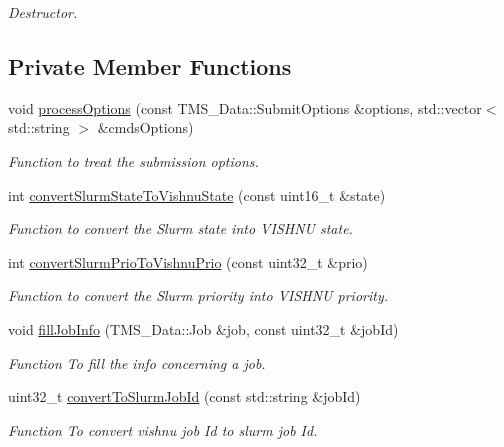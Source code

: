 \begin{DoxyCompactItemize}
\begin{DoxyCompactList}\small\item\em Destructor. \item\end{DoxyCompactList}\end{DoxyCompactItemize}
\subsection*{Private Member Functions}
\begin{DoxyCompactItemize}
\item 
void \hyperlink{classSlurmServer_a04c8991b630a2b23d0da7a9814bcae47}{processOptions} (const TMS\_\-Data::SubmitOptions \&options, std::vector$<$ std::string $>$ \&cmdsOptions)
\begin{DoxyCompactList}\small\item\em Function to treat the submission options. \item\end{DoxyCompactList}\item 
int \hyperlink{classSlurmServer_a294e9fcc0e094584645838773a5f454e}{convertSlurmStateToVishnuState} (const uint16\_\-t \&state)
\begin{DoxyCompactList}\small\item\em Function to convert the Slurm state into VISHNU state. \item\end{DoxyCompactList}\item 
int \hyperlink{classSlurmServer_a307212f4e936651b7c9f98c6878ff94c}{convertSlurmPrioToVishnuPrio} (const uint32\_\-t \&prio)
\begin{DoxyCompactList}\small\item\em Function to convert the Slurm priority into VISHNU priority. \item\end{DoxyCompactList}\item 
void \hyperlink{classSlurmServer_a0dbf7a58ec3a83676a09c4c74e858467}{fillJobInfo} (TMS\_\-Data::Job \&job, const uint32\_\-t \&jobId)
\begin{DoxyCompactList}\small\item\em Function To fill the info concerning a job. \item\end{DoxyCompactList}\item 
uint32\_\-t \hyperlink{classSlurmServer_a395cdd78cbe080d1834b403f3712402a}{convertToSlurmJobId} (const std::string \&jobId)
\begin{DoxyCompactList}\small\item\em Function To convert vishnu job Id to slurm job Id. \item\end{DoxyCompactList}\item 

\end{DoxyCompactItemize}
